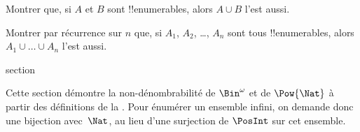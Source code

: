 \documentclass[11pt,a4paper,openany]{memoir}
\begin{document}
\begin{prob}
Montrer que, si $A$ et $B$ sont !!{enumerable}s, alors
$A \cup B$ l'est aussi.
\end{prob}

\begin{prob}
Montrer par récurrence sur $n$ que, si $A_1$, $A_2$, \dots,
$A_n$ sont tous !!{enumerable}s, alors $A_1 \cup \dots \cup A_n$
l'est aussi.
\end{prob}


\endgroup


\begingroup
\expandafter\def\csname ol@sectioncs\endcsname{section}
\def\olfilename{non-enumerability-alt}




\begin{editorial}
  Cette section démontre la non-dénombrabilité de $\Bin^\omega$
  et de $\Pow{\Nat}$ à partir des définitions de la
  . Pour énumérer un ensemble infini, on
  demande donc une bijection avec~$\Nat$, au lieu d'une
  surjection de $\PosInt$ sur cet ensemble.
\end{editorial}
\end{document}
